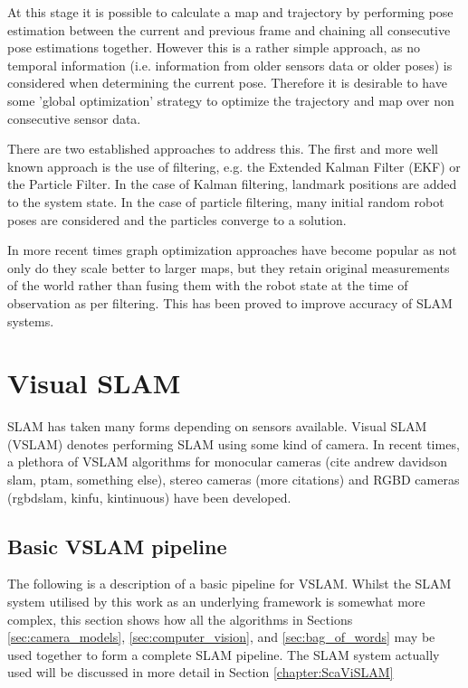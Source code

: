 At this stage it is possible to calculate a map and trajectory by performing pose estimation between the current and previous frame and chaining all consecutive pose estimations together.  However this is a rather simple approach, as no temporal information (i.e. information from older sensors data or older poses) is considered when determining the current pose.  Therefore it is desirable to have some 'global optimization' strategy to optimize the trajectory and map over non consecutive sensor data.

There are two established approaches to address this.  The first and more well known approach is the use of filtering, e.g. the Extended Kalman Filter (EKF) or the Particle Filter.  In the case of Kalman filtering, landmark positions are added to the system state.  In the case of particle filtering, many initial random robot poses are considered and the particles converge to a solution.

In more recent times graph optimization approaches have become popular as not only do they scale better to larger maps, but they retain original measurements of the world rather than fusing them with the robot state at the time of observation as per filtering.  This has been proved to improve accuracy of SLAM systems.

\section{Visual SLAM}

SLAM has taken many forms depending on sensors available. Visual SLAM (VSLAM) denotes performing SLAM using some kind of camera.  In recent times, a plethora of VSLAM algorithms for monocular cameras (cite andrew davidson slam, ptam, something else), stereo cameras (more citations) and RGBD cameras (rgbdslam, kinfu, kintinuous) have been developed.

\subsection{Basic VSLAM pipeline}

The following is a description of a basic pipeline for VSLAM.  Whilst the SLAM system utilised by this work as an underlying framework is somewhat more complex, this section shows how all the algorithms in Sections \ref{sec:camera_models}, \ref{sec:computer_vision}, and \ref{sec:bag_of_words} may be used together to form a complete SLAM pipeline.  The SLAM system actually used will be discussed in more detail in Section \ref{chapter:ScaViSLAM}


